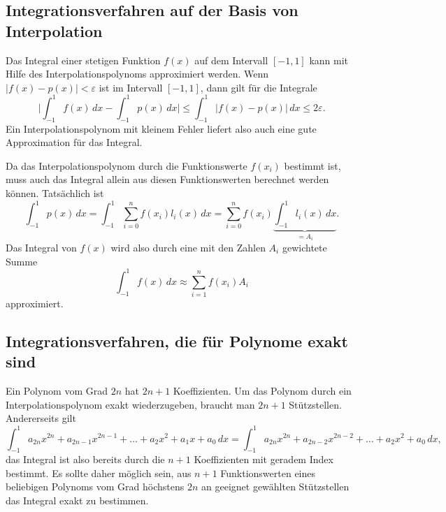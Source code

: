 \subsection{Integrationsverfahren auf der Basis von Interpolation}
Das Integral einer stetigen Funktion $f(x)$ auf dem Intervall $[-1,1]$
kann mit Hilfe des Interpolationspolynoms approximiert werden.
Wenn $|f(x)-p(x)|<\varepsilon$ ist im Intervall $[-1,1]$, dann gilt
für die Integrale
\[
\biggl|\int_{-1}^1 f(x)\,dx -\int_{-1}^1p(x)\,dx\biggr|
\le
\int_{-1}^1 |f(x)-p(x)|\,dx
\le
2\varepsilon.
\]
Ein Interpolationspolynom mit kleinem Fehler liefert also auch
eine gute Approximation für das Integral.

Da das Interpolationspolynom durch die Funktionswerte $f(x_i)$
bestimmt ist, muss auch das Integral allein aus diesen Funktionswerten
berechnet werden können.
Tatsächlich ist
\begin{equation}
\int_{-1}^1 p(x)\,dx
=
\int_{-1}^1 \sum_{i=0}^n f(x_i)l_i(x)\,dx
=
\sum_{i=0}^n f(x_i)
\underbrace{\int_{-1}^1
l_i(x)\,dx}_{\displaystyle = A_i}.
\label{buch:integral:gaussquadratur:eqn:Aidef}
\end{equation}
Das Integral von $f(x)$ wird also durch eine mit den Zahlen $A_i$
gewichtete Summe
\[
\int_{-1}^1 f(x)\,dx
\approx
\sum_{i=1}^n f(x_i)A_i
\]
approximiert.

%
%
\subsection{Integrationsverfahren, die für Polynome exakt sind
\label{buch:orthogonal:subsection:exakt}}
Ein Polynom vom Grad $2n$ hat $2n+1$ Koeffizienten.
Um das Polynom durch ein Interpolationspolynom exakt wiederzugeben,
braucht man $2n+1$ Stützstellen.
Andererseits gilt
\[
\int_{-1}^1 a_{2n}x^{2n} + a_{2n-1}x^{2n-1} + \dots + a_2x^2 + a_1x + a_0\,dx
=
\int_{-1}^1 a_{2n}x^{2n} + a_{2n-2}x^{2n-2}+\dots +a_2x^2 +a_0\,dx,
\]
das Integral ist also bereits durch die $n+1$ Koeffizienten mit geradem
Index bestimmt.
Es sollte daher möglich sein, aus $n+1$ Funktionswerten eines beliebigen
Polynoms vom Grad höchstens $2n$ an geeignet gewählten Stützstellen das
Integral exakt zu bestimmen.

